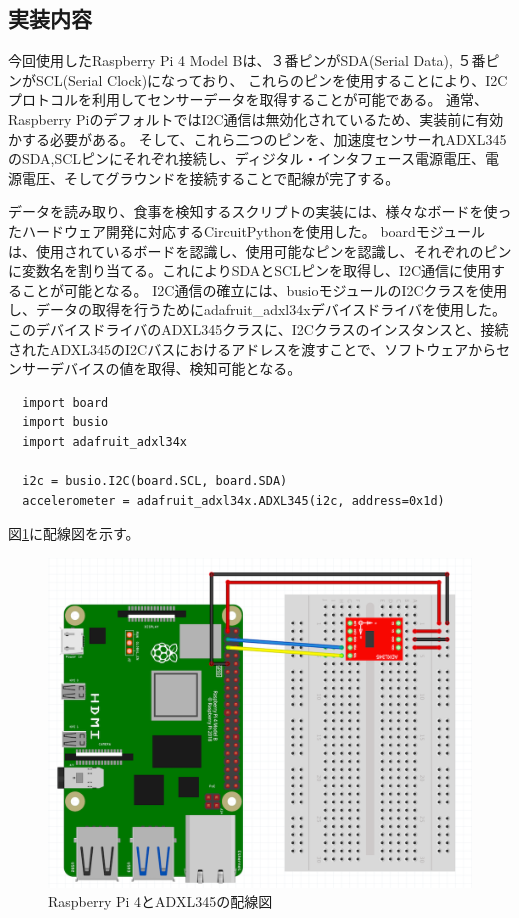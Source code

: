 \subsection{実装内容}

今回使用したRaspberry Pi 4 Model Bは、３番ピンがSDA(Serial Data), ５番ピンがSCL(Serial Clock)になっており、
これらのピンを使用することにより、I2Cプロトコルを利用してセンサーデータを取得することが可能である。
通常、Raspberry PiのデフォルトではI2C通信は無効化されているため、実装前に有効かする必要がある。
そして、これら二つのピンを、加速度センサーれADXL345のSDA,SCLピンにそれぞれ接続し、ディジタル・インタフェース電源電圧、電源電圧、そしてグラウンドを接続することで配線が完了する。\cite{adxl345_datasheet}

データを読み取り、食事を検知するスクリプトの実装には、様々なボードを使ったハードウェア開発に対応するCircuitPythonを使用した。
boardモジュールは、使用されているボードを認識し、使用可能なピンを認識し、それぞれのピンに変数名を割り当てる。これによりSDAとSCLピンを取得し、I2C通信に使用することが可能となる。
I2C通信の確立には、busioモジュールのI2Cクラスを使用し、データの取得を行うためにadafruit\_adxl34xデバイスドライバを使用した。
このデバイスドライバのADXL345クラスに、I2Cクラスのインスタンスと、接続されたADXL345のI2Cバスにおけるアドレスを渡すことで、ソフトウェアからセンサーデバイスの値を取得、検知可能となる。

\begin{verbatim}
  import board
  import busio
  import adafruit_adxl34x

  i2c = busio.I2C(board.SCL, board.SDA)
  accelerometer = adafruit_adxl34x.ADXL345(i2c, address=0x1d)
\end{verbatim}

図\ref{fig:meal_detector_wire_illustration}に配線図を示す。

\begin{figure}[htbp]
  \caption{Raspberry Pi 4とADXL345の配線図}
  \label{fig:meal_detector_wire_illustration}
  \begin{center}
    \includegraphics[bb=0 0 1000 800,width=15cm]{assets/raspi_adxl345.png}
  \end{center}
\end{figure}

